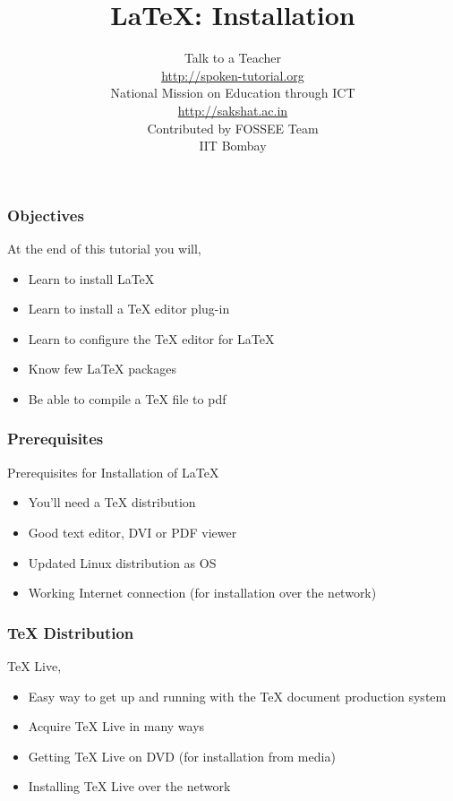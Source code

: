 \documentclass[17pt,compress]{beamer}
\author[FOSSEE]{}
\institute[IIT Bombay]{}
\date[]{}
\begin{document}
\sffamily \bfseries
\title
[\LaTeX: \: Installation]
{\LaTeX: \:Installation}
\author
[FOSSEE]
{\small Talk to a Teacher\\{\color{blue}\url{http://spoken-tutorial.org}}\\\vspace{0.25cm}National Mission on Education
 through ICT\\{\color{blue}\url{ http://sakshat.ac.in}} \\ [1.65cm]
   Contributed by FOSSEE Team \\IIT Bombay  \\[0.3cm]
}

\begin{frame}
   \titlepage
\end{frame}

\begin{frame}
  \frametitle{Objectives}
  At the end of this tutorial you will,
  \begin{itemize}
  \item Learn to install LaTeX
  \item Learn to install a TeX editor plug-in
  \item Learn to configure the TeX editor for LaTeX
  \item Know few LaTeX packages
  \item Be able to compile a TeX file to pdf

  \end{itemize}
\end{frame}

\begin{frame}
  \frametitle{Prerequisites}
  Prerequisites for Installation of LaTeX
  \begin{itemize}
  \item You'll need a TeX distribution
  \item Good text editor, DVI or PDF viewer
  \item Updated Linux distribution as OS
  \item Working Internet connection (for installation over the network)
  \end{itemize}
\end{frame}

\begin{frame}[fragile]
  \frametitle{TeX Distribution}
  TeX Live,
  \begin{itemize}
  \item Easy way to get up and running with the TeX document production system
  \item Acquire TeX Live in many ways
  \item Getting TeX Live on DVD (for installation from media)
  \item Installing TeX Live over the network
  \end{itemize}
\end{frame}
\end{document}
